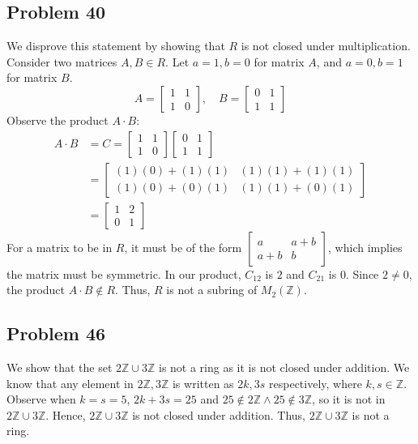 \documentclass[a4paper,12pt]{article}
\begin{document}
\subsection*{Problem 40}
We disprove this statement by showing that $R$ is not closed under multiplication.
\\ Consider two matrices $A, B \in R.$ Let $a=1, b=0$ for matrix $A$, and $a=0, b=1$ for matrix $B.$
\[
    A = \begin{bmatrix} 1 & 1 \\ 1 & 0 \end{bmatrix}, \quad B = \begin{bmatrix} 0 & 1 \\ 1 & 1 \end{bmatrix}
\]
Observe the product $A \cdot B$:
\begin{align*}
    A \cdot B &=C= \begin{bmatrix} 1 & 1 \\ 1 & 0 \end{bmatrix} \begin{bmatrix} 0 & 1 \\ 1 & 1 \end{bmatrix} \\
    &= \begin{bmatrix} (1)(0) + (1)(1) & (1)(1) + (1)(1) \\ (1)(0) + (0)(1) & (1)(1) + (0)(1) \end{bmatrix} \\
    &= \begin{bmatrix} 1 & 2 \\ 0 & 1 \end{bmatrix}
\end{align*}
For a matrix to be in $R$, it must be of the form $\begin{bmatrix} a & a+b \\ a+b & b \end{bmatrix}$, which implies the matrix must be symmetric.
In our product, $C_{12}$ is $2$ and $C_{21}$ is $0.$ Since $2 \neq 0$, the product $A \cdot B \notin R.$
Thus, $R$ is not a subring of $M_2(\mathbb{Z}).$

\subsection*{Problem 46}
We show that the set $2\mathbb{Z} \cup 3\mathbb{Z}$ is not a ring as it is not closed under addition. We know that any element in $2\mathbb{Z}, 3\mathbb{Z}$ is written as $2k, 3s$ respectively, where $k,s \in \mathbb{Z}.$ Observe when $k=s=5$, $2k+3s=25$ and $25 \notin 2\mathbb{Z} \wedge 25 \notin 3\mathbb{Z}$, so it is not in $2\mathbb{Z}\cup 3\mathbb{Z}$. Hence, $2\mathbb{Z}\cup 3\mathbb{Z}$ is not closed under addition. Thus, $2\mathbb{Z}\cup 3\mathbb{Z}$ is not a ring.
\end{document}
